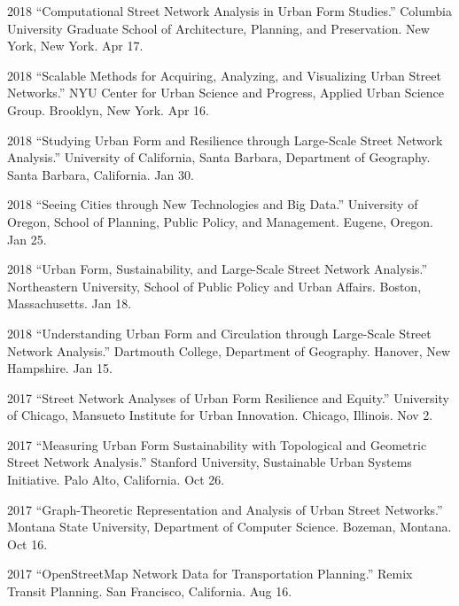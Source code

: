 \documentclass[11pt,letterpaper]{report}
\begin{document}
\begin{tablist}
        \item[2018] \tab{}\enquote{Computational Street Network Analysis in Urban Form Studies.} Columbia University Graduate School of Architecture, Planning, and Preservation. New York, New York. Apr 17.

        \item[2018] \tab{}\enquote{Scalable Methods for Acquiring, Analyzing, and Visualizing Urban Street Networks.} NYU Center for Urban Science and Progress, Applied Urban Science Group. Brooklyn, New York. Apr 16.

        \item[2018] \tab{}\enquote{Studying Urban Form and Resilience through Large-Scale Street Network Analysis.} University of California, Santa Barbara, Department of Geography. Santa Barbara, California. Jan 30.

        \item[2018] \tab{}\enquote{Seeing Cities through New Technologies and Big Data.} University of Oregon, School of Planning, Public Policy, and Management. Eugene, Oregon. Jan 25.

        \item[2018] \tab{}\enquote{Urban Form, Sustainability, and Large-Scale Street Network Analysis.} Northeastern University, School of Public Policy and Urban Affairs. Boston, Massachusetts. Jan 18.

        \item[2018] \tab{}\enquote{Understanding Urban Form and Circulation through Large-Scale Street Network Analysis.} Dartmouth College, Department of Geography. Hanover, New Hampshire. Jan 15.

        \item[2017] \tab{}\enquote{Street Network Analyses of Urban Form Resilience and Equity.} University of Chicago, Mansueto Institute for Urban Innovation. Chicago, Illinois. Nov 2.

        \item[2017] \tab{}\enquote{Measuring Urban Form Sustainability with Topological and Geometric Street Network Analysis.} Stanford University, Sustainable Urban Systems Initiative. Palo Alto, California. Oct 26.

        \item[2017] \tab{}\enquote{Graph-Theoretic Representation and Analysis of Urban Street Networks.} Montana State University, Department of Computer Science. Bozeman, Montana. Oct 16.

        \item[2017] \tab{}\enquote{OpenStreetMap Network Data for Transportation Planning.} Remix Transit Planning. San Francisco, California. Aug 16.


\end{tablist}
\end{document}
